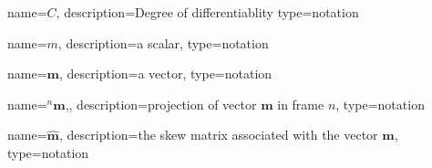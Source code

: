 
	\newcommand{\contdeg}[1]{\ensuremath{\gls{not:contdeg}^{#1}}}
	{%
		name=\ensuremath{C},
		description=Degree of differentiablity
		type=notation
	}
	\newcommand{\der}{\ensuremath{\mathrm{d}}}

	{%
		name=\ensuremath{m},
		description=a scalar,
		type=notation
	}

	\renewcommand{\vec}[1]{\ensuremath{\boldsymbol{#1}}}
	{%
		name=\vec{m},
		description=a vector,
		type=notation
	}

	\newcommand{\project}[2]{\ensuremath{{}^{#2}\!{#1}}}
	{%
		name=\project{\vec{m}}{n},,
		description=projection of vector \vec{m} in frame $n$,
		type=notation
	}

	\newcommand{\skewmat}[1]{\ensuremath{\widehat{#1}}}
	{%
		name=\skewmat{\vec{m}},
		description=the skew matrix associated with the vector \vec{m},
		type=notation
	}

